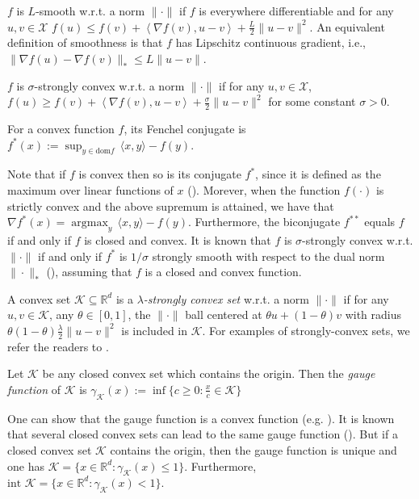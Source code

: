 \documentclass[pmlr]{jmlr} %
\def\reals{\mathbb{R}}
\def\g{\gamma_{\K}}
\def\reals{\mathbb{R}}
\def\K{\mathcal{K}}
\newcommand{\lr}[2]{\left\langle#1,#2\right\rangle}
\newcommand{\XX}{\mathcal{X}}
\begin{document}
\begin{definition}
$f$ is $L$-smooth w.r.t. a norm $\| \cdot \|$ if $f$ is everywhere differentiable and for any $u,v\in \XX$
$f( u ) \leq f(v) + \lr{\nabla f(v)}{ u - v } + \frac{L}{2} \| u - v \|^{2}$. 
An equivalent definition of smoothness is that $f$ has Lipschitz continuous gradient, i.e.,
$\| \nabla f(u) - \nabla f(v) \|_{*}\leq L \| u - v\|$.
\end{definition}

\begin{definition}
$f$ is $\sigma$-strongly convex w.r.t. a norm $\| \cdot \|$ if for any $u,v\in\XX$, $f( u ) \geq f(v) + \lr{\nabla f(v)}{ u - v } + \frac{\sigma}{2} \| u - v \|^{2}$ for some constant $\sigma>0$.
\end{definition}

\begin{definition}
For a convex function $f$, its Fenchel conjugate is $f^{*}(x) :=\displaystyle  \sup_{ y \in \text{dom} f } \,  \langle x, y \rangle - f(y)$.
\end{definition}
Note that if $f$ is convex then so is its conjugate $f^{*}$, since it is defined as the maximum over linear functions of $x$ (\cite{B04}). Morever, when the function $f(\cdot)$ is strictly convex and the above supremum is attained, we have that $\nabla f^{*}(x) = \displaystyle  \mathop{\arg\max}_{y}  \,  \langle x, y \rangle - f(y) $. 
Furthermore, the biconjugate $f^{**}$ equals $f$ if and only if $f$ is closed and convex.
It is known that $f$ is $\sigma$-strongly convex w.r.t. $\| \cdot \|$ if and only if $f^{\ast}$ is $1/\sigma$ strongly smooth 
with respect to the dual norm $\| \cdot \|_{*}$ (\cite{KST09}), assuming that $f$ is a closed and convex function.


\begin{definition}
A convex set $\K \subseteq \reals^{d}$ is a \emph{$\lambda$-strongly convex set} w.r.t. a norm $\| \cdot \|$ 
if for any $u, v \in \K$, any $\theta \in [0,1]$,
the $\| \cdot \|$ ball centered at $ \theta u + ( 1 - \theta) v$ with radius 
$\theta (1 - \theta) \frac{\lambda}{2} \| u - v \|^{2}$ is included in $\K$.
For examples of strongly-convex sets, we refer the readers to \citep{D15}. 	
\end{definition}

\begin{definition}
Let $\K$ be any closed convex set which contains the origin.
Then the \emph{gauge function} of $\K$ is $\g(x) := \inf \{ c \geq 0: \frac{x}{c} \in \K \}$
\end{definition}
One can show that the gauge function is a convex function (e.g. \cite{R96}). 
It is known that several closed convex sets can lead to the same gauge function (\cite{B13}).
But if a closed convex set $\K$ contains the origin, then the gauge function is unique and one has
$\K = \{ x \in \reals^{d}: \g(x)\leq 1 \}$.
Furthermore, $\text{int } \K = \{ x \in \reals^{d}: \g(x)< 1 \}.$
\end{document}
